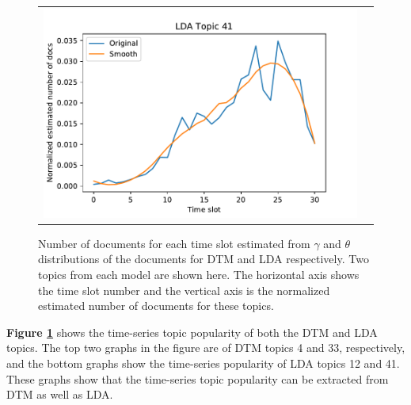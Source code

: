\begin{figure}[h!]
\begin{center}
\begin{tabular}{cc}
\includegraphics[scale=.5]{LDApopulationTopic41.pdf}
\end{tabular}
\caption{Number of documents for each time slot estimated from $\gamma$ and $\theta$ distributions of the documents for DTM and LDA respectively. Two topics from each model are shown here. The horizontal axis shows the time slot number and the vertical axis is the normalized estimated number of documents for these topics.}
\label{fig:populationGraphs}
\end{center}
\end{figure}


\textbf{Figure \ref{fig:populationGraphs}} shows the time-series topic popularity of both the DTM and LDA topics. The top two graphs in the figure are of DTM topics 4 and 33, respectively, and the bottom graphs show the time-series popularity of LDA topics 12 and 41. These graphs show that the time-series topic popularity can be extracted from DTM as well as LDA.
